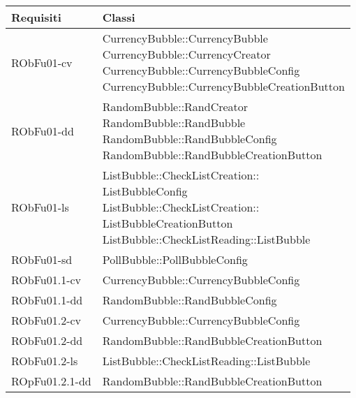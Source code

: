 \begin{center}
\begin{longtable}{|
*{1}{>{\centering\arraybackslash}m{2.5cm}|}
*{1}{>{\centering\arraybackslash}m{7.5cm}|}}
\hline \textbf{Requisiti} & \textbf{Classi}\\
\hline \endhead
\hline \endfoot

RObFu01-cv & \makecell[l]{CurrencyBubble::CurrencyBubble
\\CurrencyBubble::CurrencyCreator
\\CurrencyBubble::CurrencyBubbleConfig
\\CurrencyBubble::CurrencyBubbleCreationButton
\\}\\\hline
RObFu01-dd & \makecell[l]{RandomBubble::RandCreator
\\RandomBubble::RandBubble
\\RandomBubble::RandBubbleConfig
\\RandomBubble::RandBubbleCreationButton
\\}\\\hline
RObFu01-ls & \makecell[l]{ListBubble::CheckListCreation:: \\ \hfill ListBubbleConfig
\\ListBubble::CheckListCreation:: \\ \hfill ListBubbleCreationButton
\\ListBubble::CheckListReading::ListBubble
\\}\\\hline
RObFu01-sd & \makecell[l]{PollBubble::PollBubbleConfig
\\}\\\hline
RObFu01.1-cv & \makecell[l]{CurrencyBubble::CurrencyBubbleConfig
\\}\\\hline
RObFu01.1-dd & \makecell[l]{RandomBubble::RandBubbleConfig
\\}\\\hline
RObFu01.2-cv & \makecell[l]{CurrencyBubble::CurrencyBubbleConfig
\\}\\\hline
RObFu01.2-dd & \makecell[l]{RandomBubble::RandBubbleCreationButton
\\}\\\hline
RObFu01.2-ls & \makecell[l]{ListBubble::CheckListReading::ListBubble
\\}\\\hline
ROpFu01.2.1-dd & \makecell[l]{RandomBubble::RandBubbleCreationButton
\\}\\\hline

\end{longtable}
\end{center}
